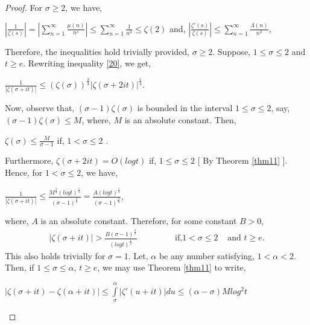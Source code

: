 \documentclass[10pt,a4paper]{amsart}
\begin{document}
	\begin{proof}
		For $\sigma\geq 2$, we have,
		\begin{center}
			$|\frac{1}{\zeta(s)}|=|\sum\limits_{n=1}^{\infty}\frac{\mu(n)}{n^{s}}|\leq \sum\limits_{n=1}^{\infty}\frac{1}{n^{2}}\leq \zeta(2)$ \hspace{10pt} and, \hspace{10pt} $|\frac{\zeta'(s)}{\zeta(s)}|\leq \sum\limits_{n=1}^{\infty}\frac{\Lambda(n)}{n^{2}}$,
		\end{center}
		Therefore, the inequalities hold trivially provided, $\sigma\geq 2$. Suppose, $1\leq \sigma\leq 2$ and $t\geq e$. Rewriting inequality \eqref{20}, we get,
		\begin{center}
			$\frac{1}{|\zeta(\sigma+it)|}\leq (\zeta(\sigma))^{\frac{3}{4}}|\zeta(\sigma+2it)|^{\frac{1}{4}}$.
		\end{center}	
		Now, observe that, $(\sigma-1)\zeta(\sigma)$ is bounded in the interval $1\leq \sigma\leq 2$, say,  $(\sigma-1)\zeta(\sigma)\leq M$, where, $M$ is an absolute constant. Then,
		\begin{center}
			$\zeta(\sigma)\leq \frac{M}{\sigma-1}$ \hspace{20pt} if, \hspace{10pt} $1< \sigma\leq 2$ .
		\end{center}	
		Furthermore, $\zeta(\sigma+2it)=O(logt)$ if, $1\leq \sigma\leq 2$  [ By Theorem \eqref{thm11} ]. Hence, for $1< \sigma\leq 2$, we have,
		\begin{center}
			$\frac{1}{|\zeta(\sigma+it)|}\leq \frac{M^{\frac{3}{4}}(logt)^{\frac{1}{4}}}{(\sigma-1)^{\frac{3}{4}}}=\frac{A(logt)^{\frac{1}{4}}}{(\sigma-1)^{\frac{3}{4}}}$,
		\end{center}	
		where, $A$ is an absolute constant. Therefore, for some constant $B>0$, 
		\begin{eqnarray}\label{22}
			|\zeta(\sigma+it)|>\frac{B(\sigma-1)^{\frac{3}{4}}}{(logt)^{\frac{1}{4}}} \hspace{40pt} &\mbox{ if,} 1<\sigma\leq 2 &\mbox{ and  } t\geq e.
		\end{eqnarray}	
		This also holds trivially for $\sigma=1$. Let, $\alpha$ be any number satisfying, $1<\alpha<2$.  Then, if $1\leq \sigma\leq \alpha$, $t\geq e$,  we may use Theorem \eqref{thm11} to write,
		\begin{center}
			$|\zeta(\sigma+it)-\zeta(\alpha+it)|\leq \int\limits_{\sigma}^{\alpha}|\zeta'(u+it)|du\leq (\alpha-\sigma)Mlog^{2}t$
		\end{center}	
		\begin{center}

\end{center}
\end{proof}
\end{document}
